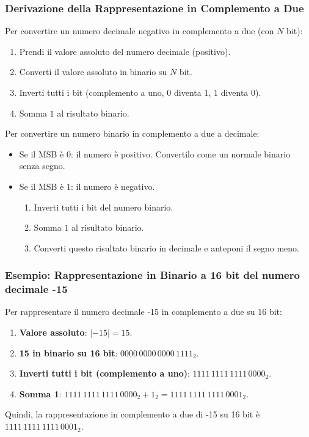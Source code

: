 \subsubsection{Derivazione della Rappresentazione in Complemento a Due}
Per convertire un numero decimale negativo in complemento a due (con $N$ bit):
\begin{enumerate}
    \item Prendi il valore assoluto del numero decimale (positivo).
    \item Converti il valore assoluto in binario su $N$ bit.
    \item Inverti tutti i bit (complemento a uno, $0$ diventa $1$, $1$ diventa $0$).
    \item Somma $1$ al risultato binario.
\end{enumerate}
Per convertire un numero binario in complemento a due a decimale:
\begin{itemize}
    \item Se il MSB è $0$: il numero è positivo. Convertilo come un normale binario senza segno.
    \item Se il MSB è $1$: il numero è negativo.
    \begin{enumerate}
        \item Inverti tutti i bit del numero binario.
        \item Somma $1$ al risultato binario.
        \item Converti questo risultato binario in decimale e anteponi il segno meno.
    \end{enumerate}
\end{itemize}

\subsubsection{Esempio: Rappresentazione in Binario a 16 bit del numero decimale -15}
Per rappresentare il numero decimale -15 in complemento a due su 16 bit:
\begin{enumerate}
    \item \textbf{Valore assoluto}: $|-15| = 15$.
    \item \textbf{15 in binario su 16 bit}: $0000\,0000\,0000\,1111_2$.
    \item \textbf{Inverti tutti i bit (complemento a uno)}: $1111\,1111\,1111\,0000_2$.
    \item \textbf{Somma 1}: $1111\,1111\,1111\,0000_2 + 1_2 = 1111\,1111\,1111\,0001_2$.
\end{enumerate}
Quindi, la rappresentazione in complemento a due di -15 su 16 bit è $1111\,1111\,1111\,0001_2$.

